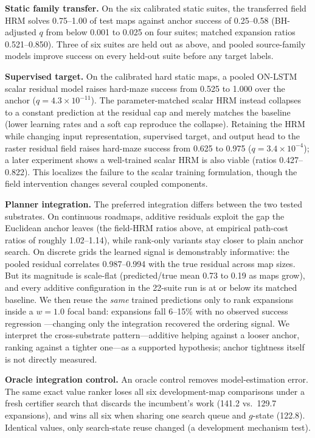 \documentclass[letterpaper]{article} %
\begin{document}
\textbf{Static family transfer.} On the six calibrated static suites, the transferred field HRM solves 0.75--1.00 of test maps against anchor success of 0.25--0.58 (BH-adjusted $q$ from below 0.001 to 0.025 on four suites; matched expansion ratios 0.521--0.850). Three of six suites are held out as above, and pooled source-family models improve success on every held-out suite before any target labels.

\textbf{Supervised target.} On the calibrated hard static maps, a pooled ON-LSTM scalar residual model raises hard-maze success from 0.525 to 1.000 over the anchor ($q=4.3\times10^{-11}$). The parameter-matched scalar HRM instead collapses to a constant prediction at the residual cap and merely matches the baseline (lower learning rates and a soft cap reproduce the collapse). Retaining the HRM while changing input representation, supervised target, and output head to the raster residual field raises hard-maze success from 0.625 to 0.975 ($q=3.4\times10^{-4}$); a later experiment shows a well-trained scalar HRM is also viable (ratios 0.427--0.822). This localizes the failure to the scalar training formulation, though the field intervention changes several coupled components.

\textbf{Planner integration.} The preferred integration differs between the two tested substrates. On continuous roadmaps, additive residuals exploit the gap the Euclidean anchor leaves (the field-HRM ratios above, at empirical path-cost ratios of roughly 1.02--1.14), while rank-only variants stay closer to plain anchor search. On discrete grids the learned signal is demonstrably informative: the pooled residual correlates 0.987--0.994 with the true residual across map sizes. But its magnitude is scale-flat (predicted/true mean 0.73 to 0.19 as maps grow), and every additive configuration in the 22-suite run is at or below its matched baseline. We then reuse the \emph{same} trained predictions only to rank expansions inside a $w{=}1.0$ focal band: expansions fall 6--15\% with no observed success regression \citep{chrestien2023rank}---changing only the integration recovered the ordering signal. We interpret the cross-substrate pattern---additive helping against a looser anchor, ranking against a tighter one---as a supported hypothesis; anchor tightness itself is not directly measured.

\textbf{Oracle integration control.} An oracle control removes model-estimation error. The same exact value ranker loses all six development-map comparisons under a fresh certifier search that discards the incumbent's work (141.2 vs.\ 129.7 expansions), and wins all six when sharing one search queue and $g$-state (122.8). Identical values, only search-state reuse changed (a development mechanism test).
\end{document}

